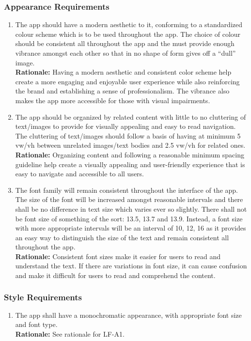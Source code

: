 \documentclass[]{article}
\begin{document}
\subsubsection{Appearance Requirements}
\label{ssub:appearance_requirements}
\begin{enumerate}[{LF-A}1. ]
	\item The app should have a modern aesthetic to it, conforming to a standardized colour scheme which is to be used throughout the app. The choice of colour should be consistent all throughout the app and the must provide enough vibrance amongst each other so that in no shape of form gives off a “dull” image.\\
	{\bf Rationale:} Having a modern aesthetic and consistent color scheme help create a more engaging and enjoyable user experience while also reinforcing the brand and establishing a sense of professionalism. The vibrance also makes the app more accessible for those with visual impairments.
	\item The app should be organized by related content with little to no cluttering of text/images to provide for visually appealing and easy to read navigation. The cluttering of text/images should follow a basis of having at minimum 5 vw/vh between unrelated images/text bodies and 2.5 vw/vh for related ones.\\
	{\bf Rationale:} Organizing content and following a reasonable minimum spacing guideline help create a visually appealing and user-friendly experience that is easy to navigate and accessible to all users.
	\item The font family will remain consistent throughout the interface of the app. The size of the font will be increased amongst reasonable intervals and there shall be no difference in text size which varies ever so slightly.  There shall not be font size of something of the sort: 13.5, 13.7 and 13.9. Instead, a font size with more appropriate intervals will be an interval of 10, 12, 16 as it provides an easy way to distinguish the size of the text and remain consistent all throughout the app.\\
	{\bf Rationale:} Consistent font sizes make it easier for users to read and understand the text. If there are variations in font size, it can cause confusion and make it difficult for users to read and comprehend the content. 
\end{enumerate}

\subsubsection{Style Requirements}
\label{ssub:style_requirements}
\begin{enumerate}[{LF-S}1. ]
	\item The app shall have a monochromatic appearance, with appropriate font size and font type.\\
	{\bf Rationale:} See rationale for LF-A1.
\end{enumerate}
\end{document}
